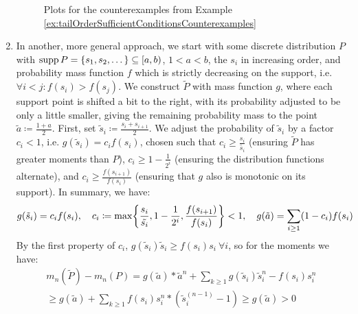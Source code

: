 \documentclass[a4paper]{scrreprt}
\begin{document}
\begin{ex}
\begin{enumerate}
\begin{figure}
                \label{fig:sufficientTailOrderConditionsCounterexamples}
                \caption{Plots for the counterexamples from Example \ref{ex:tailOrderSufficientConditionsCounterexamples}}
            \end{figure}
    
            \item 
            \label{item:discreteSufficientTailOrderConditionCounterexample}
            In another, more general approach, we start with some discrete distribution $P$ with $\operatorname{supp} P = \{s_1, s_2, \dots\} \subseteq [a, b)$, $1 < a < b$, the $s_i$ in increasing order, and probability mass function $f$ which is strictly decreasing on the support, i.e. $\forall i < j: f(s_i) > f(s_j)$. We construct $\tilde{P}$ with mass function $g$, where each support point is shifted a bit to the right, with its probability adjusted to be only a little smaller, giving the remaining probability mass to the point $\tilde{a} \coloneqq \frac{1+a}{2}$.
            First, set $\tilde{s}_i \coloneqq \frac{s_i+ s_{i+1}}{2}$.
            We adjust the probability of $\tilde{s}_i$ by a factor $c_i < 1$, i.e. $g(\tilde{s}_i) = c_i f(s_i)$, chosen such that $c_i \geq \frac{s_i}{\tilde{s_i}}$ (ensuring $\tilde{P}$ has greater moments than $P$), $c_i \geq 1-\frac{1}{2^i}$ (ensuring the distribution functions alternate), and $c_i \geq \frac{f(s_{i+1})}{f(s_i)}$ (ensuring that $g$ 
            also is monotonic on its support). In summary, we have:            
            \begin{gather*}
                g(\tilde{s}_i) = c_i f(s_i), \quad
                c_i \coloneqq \max\biggl\{\frac{s_i}{\tilde{s_i}}, 1-\frac{1}{2^i}, \frac{f(s_{i+1})}{f(s_i)}\biggr\} < 1, \quad
                g(\tilde{a}) = \sum_{i \geq 1} (1-c_i) f(s_i)
            \end{gather*}
            By the first property of $c_i$, $g(\tilde{s}_i)\tilde{s}_i \geq f(s_i)s_i ~\forall i$, so for the moments we have:
            \begin{multline*}
                m_n(\tilde{P}) - m_n(P)
                = g(\tilde{a})*\tilde{a}^n + \sum_{k \geq 1} g(\tilde{s}_i) \tilde{s}_i^n - f(s_i) s_i^n \\
                \geq g(\tilde{a}) + \sum_{k \geq 1} f(s_i) s_i^n * (\tilde{s}_i^{(n-1)} - 1)
                \geq g(\tilde{a}) > 0
            \end{multline*}
            

\end{enumerate}
\end{ex}
\end{document}
